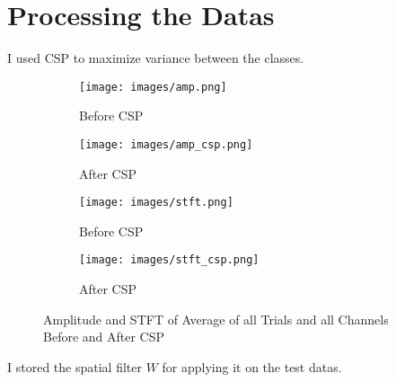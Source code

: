 \documentclass[a4paper, openany]{book}
\begin{document}
\section{Processing the Datas}
	\vspace{0.3cm}


I used CSP to maximize variance between the classes.


\begin{figure}[ht]
  \centering
  \begin{subfigure}[b]{0.45\linewidth}
    \texttt{[image: images/amp.png]}
    \caption{Before CSP}
  \end{subfigure}
    \begin{subfigure}[b]{0.45\linewidth}
    \texttt{[image: images/amp\_csp.png]}
    \caption{After CSP}
  \end{subfigure}
  \begin{subfigure}[b]{0.45\linewidth}
    \texttt{[image: images/stft.png]}
    \caption{Before CSP}
  \end{subfigure}
    \begin{subfigure}[b]{0.45\linewidth}
    \texttt{[image: images/stft\_csp.png]}
    \caption{After CSP}
  \end{subfigure}
  \caption{Amplitude and STFT of Average of all Trials and all Channels Before and After CSP}
  \label{fig:amp_stft}
\end{figure}

I stored the spatial filter $W$ for applying it on the test datas.
\end{document}
